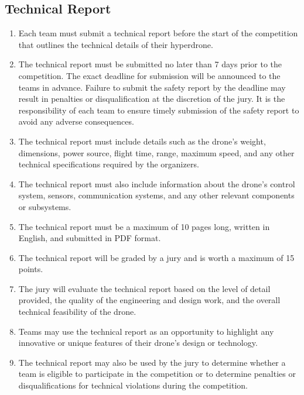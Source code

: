     \subsection{Technical Report}
    \begin{enumerate}
    \item Each team must submit a technical report before the start of the competition that outlines the technical details of their hyperdrone.
    \item The technical report must be submitted no later than 7 days prior to the competition. The exact deadline for submission will be announced to the teams in advance. Failure to submit the safety report by the deadline may result in penalties or disqualification at the discretion of the jury. It is the responsibility of each team to ensure timely submission of the safety report to avoid any adverse consequences.
    \item The technical report must include details such as the drone's weight, dimensions, power source, flight time, range, maximum speed, and any other technical specifications required by the organizers.
    \item The technical report must also include information about the drone's control system, sensors, communication systems, and any other relevant components or subsystems.
    \item The technical report must be a maximum of 10 pages long, written in English, and submitted in PDF format.
    \item The technical report will be graded by a jury and is worth a maximum of 15 points.
    \item The jury will evaluate the technical report based on the level of detail provided, the quality of the engineering and design work, and the overall technical feasibility of the drone.
    \item Teams may use the technical report as an opportunity to highlight any innovative or unique features of their drone's design or technology.
    \item The technical report may also be used by the jury to determine whether a team is eligible to participate in the competition or to determine penalties or disqualifications for technical violations during the competition.
    \end{enumerate}
    
